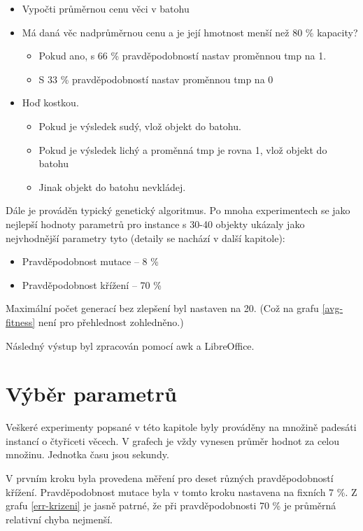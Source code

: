 \documentclass[a4paper]{article}
\begin{document}
	\begin{itemize}
		\item Vypočti průměrnou cenu věci v batohu
		\item Má daná věc nadprůměrnou cenu a je její hmotnost menší než 80 \% kapacity?
			\begin{itemize}
				\item Pokud ano, s 66 \% pravděpodobností nastav proměnnou tmp na 1.
				\item S 33 \% pravděpodobností nastav proměnnou tmp na 0
			\end{itemize}
		\item Hoď kostkou.
			\begin{itemize}
				\item Pokud je výsledek sudý, vlož objekt do batohu.
				\item Pokud je výsledek lichý a proměnná tmp je rovna 1, vlož objekt do batohu
				\item Jinak objekt do batohu nevkládej.
			\end{itemize}
	\end{itemize}
	
	Dále je prováděn typický genetický algoritmus. Po mnoha experimentech se jako nejlepší hodnoty parametrů pro instance s 30-40 objekty ukázaly jako nejvhodnější parametry tyto (detaily se nachází v další kapitole):
	\begin{itemize}
		\item Pravděpodobnost mutace -- 8 \%
		\item Pravděpodobnost křížení -- 70 \%
	\end{itemize}	
	
	Maximální počet generací bez zlepšení byl nastaven na 20. (Což na grafu \ref{avg-fitness} není pro přehlednost zohledněno.)
	
	Následný výstup byl zpracován pomocí awk a LibreOffice.
	
\section{Výběr parametrů}
	Veškeré experimenty popsané v této kapitole byly prováděny na množině padesáti instancí o čtyřiceti věcech. V grafech je vždy vynesen průměr hodnot za celou množinu. Jednotka času jsou sekundy.
	
	V prvním kroku byla provedena měření pro deset různých pravděpodobností křížení. Pravděpodobnost mutace byla v tomto kroku nastavena na fixních 7 \%. Z grafu \ref{err-krizeni} je jasně patrné, že při pravděpodobnosti 70 \% je průměrná relativní chyba nejmenší.
	
\end{document}
